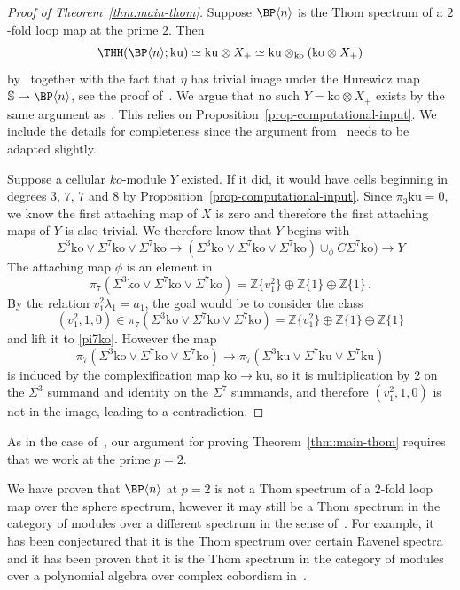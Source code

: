 \begin{proof}[Proof of Theorem~\ref{thm:main-thom}] 
Suppose $\BP\langle n\rangle$ is the Thom spectrum of a $2$-fold loop map at the prime $2$. Then 
\[ \THH(\BP\langle n\rangle;\mathrm{ku})\simeq \mathrm{ku} \otimes X_{+}\simeq \mathrm{ku} \otimes_{\mathrm{ko}}(\mathrm{ko} \otimes X_+)
\]
by~\cite[Theorem~2]{BCS10} together with the fact that $\eta$ has trivial image under the Hurewicz map $\mathbb{S}\to \BP\langle n\rangle$, see the proof of~\cite[Theorem~2]{Bea17}. We argue that no such $Y=\mathrm{ko}\otimes X_{+}$ exists by the same argument as~\cite{AHL09}. This relies on Proposition~\ref{prop-computational-input}. We include the details for completeness since the argument from~\cite{AHL09} needs to be adapted slightly. 

Suppose a cellular $ko$-module $Y$ existed. If it did, it would have cells beginning in degrees $3$, $7$, $7$ and $8$ by Proposition~\ref{prop-computational-input}. Since $\pi_3\mathrm{ku}=0$, we know the first attaching map of $X$ is zero and therefore the first attaching maps of $Y$ is also trivial. We therefore know that $Y$ begins with 
\[ \Sigma^{3}\mathrm{ko}\vee \Sigma^{7}\mathrm{ko}\vee \Sigma^{7}\mathrm{ko}\to (\Sigma^{3}\mathrm{ko}\vee \Sigma^{7}\mathrm{ko}\vee \Sigma^{7}\mathrm{ko})\cup_{\phi} C\Sigma^{7}\mathrm{ko})\to Y
\]
The attaching map $\phi$ is an element in 
\begin{equation}\label{pi7ko}\pi_{7} (\Sigma^{3}\mathrm{ko}\vee \Sigma^{7}\mathrm{ko}\vee \Sigma^{7}\mathrm{ko})=\mathbb{Z}\{v_1^2\}\oplus \mathbb{Z}\{1\}\oplus \mathbb{Z}\{1\} \,.
\end{equation}
By the relation $v_1^2\lambda_1=a_1$, the goal would be to consider the class 
\[
(v_1^2,1,0) \in \pi_{7} (\Sigma^{3}\mathrm{ko}\vee \Sigma^{7}\mathrm{ko}\vee \Sigma^{7}\mathrm{ko})=\mathbb{Z}\{v_1^2\}\oplus \mathbb{Z}\{1\}\oplus \mathbb{Z}\{1\} 
\]
and lift it to \eqref{pi7ko}. However the map 
\[
\pi_7(\Sigma^{3}\mathrm{ko}\vee \Sigma^{7}\mathrm{ko}\vee \Sigma^{7}\mathrm{ko})  \to 
\pi_7(\Sigma^{3}\mathrm{ku}\vee \Sigma^{7}\mathrm{ku}\vee \Sigma^{7}\mathrm{ku}) 
\]
is induced by the complexification map $\mathrm{ko}\to \mathrm{ku}$, so it is multiplication by 2 on the $\Sigma^3$ summand and identity on the $\Sigma^7$ summands, and therefore $(v_1^2,1,0)$ is not in the image, leading to a contradiction. 
\end{proof}

\begin{remark}
As in the case of~\cite{AHL09}, our argument for proving Theorem~\ref{thm:main-thom} requires that we work at the prime $p=2$. 
\end{remark}

\begin{remark}
We have proven that $\BP\langle n\rangle$ at $p=2$ is not a Thom spectrum of a $2$-fold loop map over the sphere spectrum, however it may still be a Thom spectrum in the category of modules over a different spectrum in the sense of~\cite{ABGHR14}. For example, it has been conjectured that it is the Thom spectrum over certain Ravenel spectra~\cite[Conjecture~1.1.3]{Dev24} and it has been proven that it is the Thom spectrum in the category of modules over a polynomial algebra over complex cobordism in~\cite{Qui25}. 
\end{remark}
